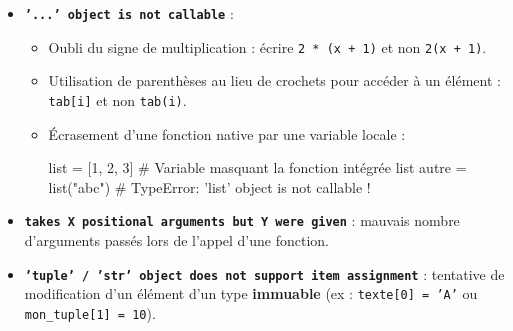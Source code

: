 \documentclass[11pt,a4paper]{article}
\begin{document}
\begin{tcolorbox}[left=0cm,title=\bf{\faBug \; 3. Erreurs de type (TypeError)},colbacktitle=cfond]
\begin{itemize}
	\item[\textbullet] \textbf{\texttt{'...' object is not callable}} :
	\begin{itemize}
		\item[\ding{226}] Oubli du signe de multiplication : écrire \texttt{2 * (x + 1)} et non \texttt{2(x + 1)}.
		\item[\ding{226}] Utilisation de parenthèses au lieu de crochets pour accéder à un élément : \texttt{tab[i]} et non \texttt{tab(i)}.
		\item[\ding{226}] Écrasement d'une fonction native par une variable locale :
		\begin{python}
list = [1, 2, 3]       # Variable masquant la fonction intégrée list
autre = list("abc")    # TypeError: 'list' object is not callable !
		\end{python}
	\end{itemize}

	\item[\textbullet] \textbf{\texttt{takes X positional arguments but Y were given}} : mauvais nombre d'arguments passés lors de l'appel d'une fonction.

	\item[\textbullet] \textbf{\texttt{'tuple' / 'str' object does not support item assignment}} : tentative de modification d'un élément d'un type \textbf{immuable} (ex : \texttt{texte[0] = 'A'} ou \texttt{mon_tuple[1] = 10}).
\end{itemize}
\end{tcolorbox}
\end{document}
